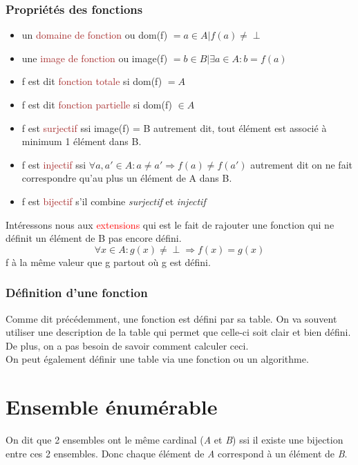 \documentclass{report}
\begin{document}
\subsubsection{Propriétés des fonctions}
\begin{itemize}
\item un \textcolor{brown}{domaine de fonction} ou dom(f) $= {a \in A | f(a) \neq \perp}$
\item une \textcolor{brown}{image de fonction} ou image(f) $= b \in B | \exists a \in A: b = f(a)$
\item f est dit \textcolor{brown}{fonction totale} si dom(f) $= A$
\item f est dit \textcolor{brown}{fonction partielle} si dom(f) $\in A$ %
\item f est \textcolor{brown}{surjectif} ssi image(f) = B autrement dit, tout élément est associé à minimum 1 élément dans B.
\item f est \textcolor{brown}{injectif} ssi $\forall a, a' \in A: a \neq a' \Rightarrow f(a)\neq f(a')$ autrement dit on ne fait correspondre qu'au plus un élément de A dans B.
\item f est \textcolor{brown}{bijectif} s'il combine \textit{surjectif} et \textit{injectif}
\end{itemize}

Intéressons nous aux \textcolor{red}{extensions} qui est le fait de rajouter une fonction qui ne définit un élément de B pas encore défini.
\begin{equation}
\forall x \in A : g(x) \neq \perp \Rightarrow f(x) = g(x)
\end{equation}	
f à la même valeur que g partout où g est défini.

\subsubsection{Définition d'une fonction}
Comme dit précédemment, une fonction est défini par sa table. On va souvent utiliser une description de la table qui permet que celle-ci soit clair et bien défini. De plus, on a pas besoin de savoir comment calculer ceci.\\
On peut également définir une table via une fonction ou un algorithme.

\section{Ensemble énumérable}
On dit que 2 ensembles ont le même cardinal (\textit{A} et \textit{B}) ssi il existe une bijection entre ces 2 ensembles. Donc chaque élément de \textit{A} correspond à un élément de \textit{B}.\\
\end{document}
